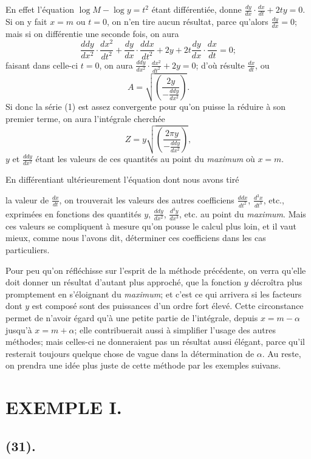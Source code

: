 \documentclass{article}
\begin{document}
En effet l'équation $\log M-\log y=t^{2}$ étant différentiée, donne $\frac{dy}{dx}\cdot\frac{dx}{dt}+2ty=0$. Si on y fait $x=m$ ou $t=0$, on n'en tire aucun résultat, parce qu'alors $\frac{dy}{dx}=0$; mais si on différentie une seconde fois, on aura
\[ \frac{ddy}{dx^{2}}\cdot\frac{dx^{2}}{dt^{2}}+\frac{dy}{dx}\cdot\frac{ddx}{dt^{2}}+2y+2t\frac{dy}{dx}\cdot\frac{dx}{dt}=0; \]
faisant dans celle-ci $t=0$, on aura $\frac{ddy}{dx^{2}}\cdot\frac{dx^{2}}{dt^{2}}+2y=0$; d'où résulte $\frac{dx}{dt}$, ou
\[ A=\sqrt{\left(\frac{2y}{-\frac{ddy}{dx^{2}}}\right)}. \]
Si donc la série (1) est assez convergente pour qu'on puisse la réduire à son premier terme, on aura l'intégrale cherchée
\[ Z=y\sqrt{\left(\frac{2\pi y}{-\frac{ddy}{dx^{2}}}\right)}, \]
$y$ et $\frac{ddy}{dx^{2}}$ étant les valeurs de ces quantités au point du \emph{maximum} où $x=m$.

En différentiant ultérieurement l'équation dont nous avons tiré

la valeur de $\frac{dx}{dt}$, on trouverait les valeurs des autres coefficiens $\frac{ddx}{dt^{2}}$, $\frac{d^{3}x}{dt^{3}}$, etc., exprimées en fonctions des quantités $y$, $\frac{ddy}{dx^{2}}$, $\frac{d^{3}y}{dx^{3}}$, etc. au point du \emph{maximum}. Mais ces valeurs se compliquent à mesure qu'on pousse le calcul plus loin, et il vaut mieux, comme nous l'avons dit, déterminer ces coefficiens dans les cas particuliers.

Pour peu qu'on réfléchisse sur l'esprit de la méthode précédente, on verra qu'elle doit donner un résultat d'autant plus approché, que la fonction $y$ décroîtra plus promptement en s'éloignant du \emph{maximum}; et c'est ce qui arrivera si les facteurs dont $y$ est composé sont des puissances d'un ordre fort élevé. Cette circonstance permet de n'avoir égard qu'à une petite partie de l'intégrale, depuis $x=m-\alpha$ jusqu'à $x=m+\alpha$; elle contribuerait aussi à simplifier l'usage des autres méthodes; mais celles-ci ne donneraient pas un résultat aussi élégant, parce qu'il resterait toujours quelque chose de vague dans la détermination de $\alpha$. Au reste, on prendra une idée plus juste de cette méthode par les exemples suivans.

\section*{EXEMPLE I.}

\subsection*{(31).}
\end{document}

